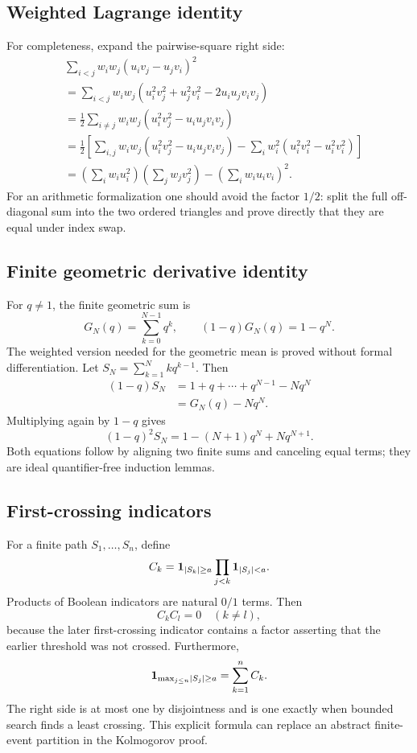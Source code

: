 \subsection{Weighted Lagrange identity}

For completeness, expand the pairwise-square right side:
\begin{align*}
&\sum_{i<j}w_iw_j(u_iv_j-u_jv_i)^2\\
&=\sum_{i<j}w_iw_j(u_i^2v_j^2+u_j^2v_i^2-2u_iu_jv_iv_j)\\
&=\frac12\sum_{i\ne j}w_iw_j
  (u_i^2v_j^2-u_iu_jv_iv_j)\\
&=\frac12\left[
   \sum_{i,j}w_iw_j(u_i^2v_j^2-u_iu_jv_iv_j)
   -\sum_iw_i^2(u_i^2v_i^2-u_i^2v_i^2)
  \right]\\
&=\left(\sum_iw_iu_i^2\right)
  \left(\sum_jw_jv_j^2\right)
 -\left(\sum_iw_iu_iv_i\right)^2.
\end{align*}
For an arithmetic formalization one should avoid the factor \(1/2\): split the
full off-diagonal sum into the two ordered triangles and prove directly that
they are equal under index swap.

\subsection{Finite geometric derivative identity}

For \(q\ne1\), the finite geometric sum is
\[
 G_N(q)=\sum_{k=0}^{N-1}q^k,
 \qquad (1-q)G_N(q)=1-q^N.
\]
The weighted version needed for the geometric mean is proved without formal
differentiation.  Let
\(S_N=\sum_{k=1}^{N}kq^{k-1}\).  Then
\begin{align*}
(1-q)S_N
 &=1+q+\cdots+q^{N-1}-Nq^N\\
 &=G_N(q)-Nq^N.
\end{align*}
Multiplying again by \(1-q\) gives
\[
 (1-q)^2S_N=1-(N+1)q^N+Nq^{N+1}.
\]
Both equations follow by aligning two finite sums and canceling equal terms;
they are ideal quantifier-free induction lemmas.

\subsection{First-crossing indicators}

For a finite path \(S_1,\ldots,S_n\), define
\[
 C_k=\mathbf 1_{\lvert S_k\rvert\ge a}
      \prod_{j<k}\mathbf 1_{\lvert S_j\rvert<a}.
\]
Products of Boolean indicators are natural \(0/1\) terms.  Then
\[
 C_kC_l=0\quad(k\ne l),
\]
because the later first-crossing indicator contains a factor asserting that
the earlier threshold was not crossed.  Furthermore,
\[
 \mathbf 1_{\max_{j\le n}\lvert S_j\rvert\ge a}=\sum_{k=1}^{n}C_k.
\]
The right side is at most one by disjointness and is one exactly when bounded
search finds a least crossing.  This explicit formula can replace an abstract
finite-event partition in the Kolmogorov proof.

